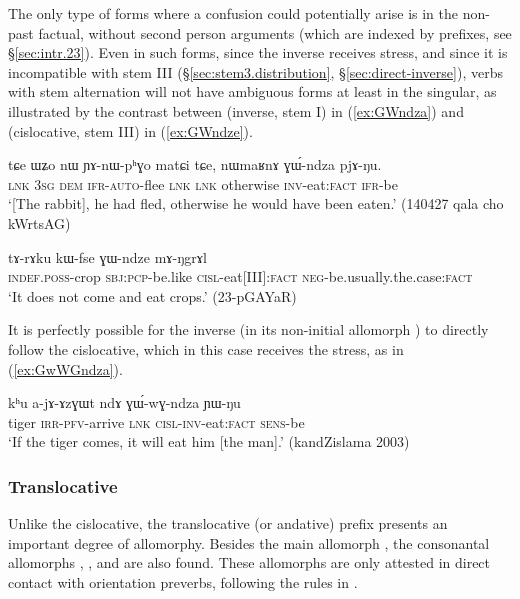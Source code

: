 The only type of forms where a confusion could potentially arise is in the non-past factual, without second person arguments (which are indexed by prefixes, see §\ref{sec:intr.23}). Even in such forms, since the inverse receives stress, and since it is incompatible with stem III (§\ref{sec:stem3.distribution}, §\ref{sec:direct-inverse}), verbs with stem alternation will not have ambiguous forms at least in the singular, as illustrated by the contrast between  (inverse, stem I) in (\ref{ex:GWndza}) and  (cislocative, stem III) in (\ref{ex:GWndze}). 

\begin{exe}
\ex \label{ex:GWndza}
 \gll  tɕe ɯʑo nɯ ɲɤ-nɯ-pʰɣo matɕi tɕe, nɯmaʁnɤ ɣɯ́-ndza pjɤ-ŋu. \\
 \textsc{lnk} \textsc{3sg} \textsc{dem} \textsc{ifr}-\textsc{auto}-flee \textsc{lnk} \textsc{lnk} otherwise \textsc{inv}-eat:\textsc{fact} \textsc{ifr}-be \\
\glt `[The rabbit], he had fled, otherwise he would have been eaten.' (140427 qala cho kWrtsAG) 
\end{exe}

\begin{exe}
\ex \label{ex:GWndze}
 \gll  tɤ-rɤku kɯ-fse ɣɯ-ndze mɤ-ŋgrɤl \\
 \textsc{indef}.\textsc{poss}-crop \textsc{sbj}:\textsc{pcp}-be.like \textsc{cisl}-eat[III]:\textsc{fact} \textsc{neg}-be.usually.the.case:\textsc{fact} \\
 \glt `It does not come and eat crops.' (23-pGAYaR) 
\end{exe}

It is perfectly possible for the inverse (in its non-initial allomorph ) to directly follow the cislocative, which in this case receives the stress, as  in (\ref{ex:GwWGndza}).

\begin{exe}
\ex \label{ex:GwWGndza}
 \gll kʰu a-jɤ-ɤzɣɯt ndɤ ɣɯ́-wɣ-ndza ɲɯ-ŋu \\
 tiger \textsc{irr}-\textsc{pfv}-arrive \textsc{lnk} \textsc{cisl}-\textsc{inv}-eat:\textsc{fact} \textsc{sens}-be \\
\glt `If the tiger comes, it will eat him [the man].' (kandZislama 2003)
\end{exe}
 
\subsubsection{Translocative} \label{sec:translocative.morpho}
Unlike the cislocative, the translocative (or andative) prefix presents an important degree of allomorphy. Besides the main allomorph , the consonantal allomorphs , ,  and  are also found. These allomorphs are only attested in direct contact with orientation preverbs, following the rules in .

